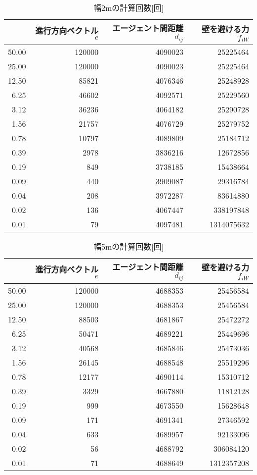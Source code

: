
\begin{table}[t]
  \centering
  \caption{幅2mの計算回数[回]}
  \label{tb:haba2_times}
  \begin{tabular}{r|r|r|r}
  \hline \hline
          & 進行方向ベクトル$e$ & エージェント間距離$d_{ij}$ & 壁を避ける力$f_{iW}$ \\ \hline
    50.00 & 120000 & 4090023 & 25225464 \\ \hline
    25.00 & 120000 & 4090023 & 25225464 \\ \hline
    12.50 & 85821 & 4076346 & 25248928 \\ \hline
    6.25 & 46602 & 4092571 & 25229560 \\ \hline
    3.12 & 36236 & 4064182 & 25290728 \\ \hline
    1.56 & 21757 & 4076729 & 25279752 \\ \hline
    0.78 & 10797 & 4089809 & 25184712 \\ \hline
    0.39 & 2978 & 3836216 & 12672856 \\ \hline
    0.19 & 849 & 3738185 & 15438664 \\ \hline
    0.09 & 440 & 3909087 & 29316784 \\ \hline
    0.04 & 208 & 3972287 & 83614880 \\ \hline
    0.02 & 136 & 4067447 & 338197848 \\ \hline
    0.01 & 79 & 4097481 & 1314075632 \\ \hline
  \end{tabular}
\end{table}

\begin{table}[t]
  \centering
  \caption{幅5mの計算回数[回]}
  \label{tb:haba5_times}
  \begin{tabular}{r|r|r|r}
  \hline \hline
    & 進行方向ベクトル$e$ & エージェント間距離$d_{ij}$ & 壁を避ける力$f_{iW}$ \\ \hline
    50.00 & 120000 & 4688353 & 25456584 \\ \hline
    25.00 & 120000 & 4688353 & 25456584 \\ \hline
    12.50 & 88503 & 4681867 & 25472272 \\ \hline
    6.25 & 50471 & 4689221 & 25449696 \\ \hline
    3.12 & 40568 & 4685846 & 25473036 \\ \hline
    1.56 & 26145 & 4688548 & 25519296 \\ \hline
    0.78 & 12177 & 4690114 & 15310712 \\ \hline
    0.39 & 3329 & 4667880 & 11812128 \\ \hline
    0.19 & 999 & 4673550 & 15628648 \\ \hline
    0.09 & 171 & 4691341 & 27346592 \\ \hline
    0.04 & 633 & 4689957 & 92133096 \\ \hline
    0.02 & 56 & 4688792 & 306084120 \\ \hline
    0.01 & 71 & 4688649 & 1312357208 \\ \hline
  \end{tabular}
\end{table}


